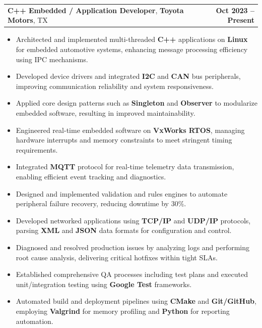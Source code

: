 \documentclass[letterpaper,11pt]{article}
\makeatletter
\newcommand{\resumeItem}[1]{
  \item\footnotesize{
    {#1 \vspace{-2pt}}
  }
}
\newcommand{\resumeSubheading}[4]{
  \vspace{-2pt}\item
    \begin{tabular*}{1.0\textwidth}[t]{l@{\extracolsep{\fill}}r}
      \textbf{\fontsize{10pt}{14pt}\selectfont #3}, \textbf{\fontsize{10pt}{14pt}\selectfont #1}, \fontsize{10pt}{14pt}\selectfont #4 & \textbf{\fontsize{10pt}{14pt}\selectfont #2} \\
    \end{tabular*}\vspace{-7pt}
}
\newcommand{\resumeItemListStart}{\begin{itemize}[leftmargin=*]}
\newcommand{\resumeItemListEnd}{\end{itemize}\vspace{-5pt}}
\makeatother
\begin{document}
    \resumeSubheading
        {Toyota Motors}{Oct 2023 -- Present}
        {C++ Embedded / Application Developer}{TX}
      \resumeItemListStart
        \resumeItem{Architected and implemented multi-threaded \textbf{C++} applications on \textbf{Linux} for embedded automotive systems, enhancing message processing efficiency using IPC mechanisms.}
        \resumeItem{Developed device drivers and integrated \textbf{I2C} and \textbf{CAN} bus peripherals, improving communication reliability and system responsiveness.}
        \resumeItem{Applied core design patterns such as \textbf{Singleton} and \textbf{Observer} to modularize embedded software, resulting in improved maintainability.}
        \resumeItem{Engineered real-time embedded software on \textbf{VxWorks RTOS}, managing hardware interrupts and memory constraints to meet stringent timing requirements.}
        \resumeItem{Integrated \textbf{MQTT} protocol for real-time telemetry data transmission, enabling efficient event tracking and diagnostics.}
        \resumeItem{Designed and implemented validation and rules engines to automate peripheral failure recovery, reducing downtime by 30\%.}
        \resumeItem{Developed networked applications using \textbf{TCP/IP} and \textbf{UDP/IP} protocols, parsing \textbf{XML} and \textbf{JSON} data formats for configuration and control.}
        \resumeItem{Diagnosed and resolved production issues by analyzing logs and performing root cause analysis, delivering critical hotfixes within tight SLAs.}
        \resumeItem{Established comprehensive QA processes including test plans and executed unit/integration testing using \textbf{Google Test} frameworks.}
        \resumeItem{Automated build and deployment pipelines using \textbf{CMake} and \textbf{Git/GitHub}, employing \textbf{Valgrind} for memory profiling and \textbf{Python} for reporting automation.}
      \resumeItemListEnd
\end{document}
